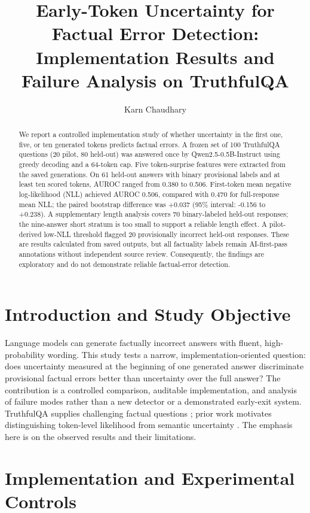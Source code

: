 \documentclass[runningheads]{llncs}
\title{Early-Token Uncertainty for Factual Error Detection: Implementation Results and Failure Analysis on TruthfulQA}
\author{Karn Chaudhary}\authorrunning{K. Chaudhary}
\institute{Indian Institute of Information Technology Allahabad (IIIT Allahabad)\\Prayagraj, Uttar Pradesh, India}
\begin{document}
\maketitle
\begin{abstract}
We report a controlled implementation study of whether uncertainty in the first one, five, or ten generated tokens predicts factual errors. A frozen set of 100 TruthfulQA questions (20 pilot, 80 held-out) was answered once by Qwen2.5-0.5B-Instruct using greedy decoding and a 64-token cap. Five token-surprise features were extracted from the saved generations. On 61 held-out answers with binary provisional labels and at least ten scored tokens, AUROC ranged from 0.380 to 0.506. First-token mean negative log-likelihood (NLL) achieved AUROC 0.506, compared with 0.470 for full-response mean NLL; the paired bootstrap difference was +0.037 (95\% interval: -0.156 to +0.238). A supplementary length analysis covers 70 binary-labeled held-out responses; the nine-answer short stratum is too small to support a reliable length effect. A pilot-derived low-NLL threshold flagged 20 provisionally incorrect held-out responses. These are results calculated from saved outputs, but all factuality labels remain AI-first-pass annotations without independent source review. Consequently, the findings are exploratory and do not demonstrate reliable factual-error detection.
\end{abstract}
\section{Introduction and Study Objective}
Language models can generate factually incorrect answers with fluent, high-probability wording. This study tests a narrow, implementation-oriented question: does uncertainty measured at the beginning of one generated answer discriminate provisional factual errors better than uncertainty over the full answer? The contribution is a controlled comparison, auditable implementation, and analysis of failure modes rather than a new detector or a demonstrated early-exit system. TruthfulQA supplies challenging factual questions \cite{lin2022}; prior work motivates distinguishing token-level likelihood from semantic uncertainty \cite{kuhn2023,farquhar2024,manakul2023}. The emphasis here is on the observed results and their limitations.
\section{Implementation and Experimental Controls}
\end{document}
